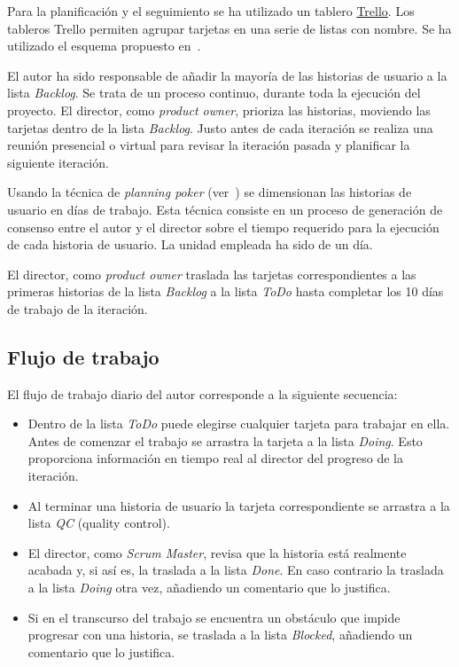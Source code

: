 Para la planificación y el seguimiento se ha utilizado un tablero \href{http://trello.com}{Trello}.  Los tableros Trello permiten agrupar tarjetas en una serie de listas con nombre.  Se ha utilizado el esquema propuesto en~\cite{andrewlittlefield2018}.

El autor ha sido responsable de añadir la mayoría de las historias de usuario a la lista \emph{Backlog}.  Se trata de un proceso continuo, durante toda la ejecución del proyecto.  El director, como \emph{product owner}, prioriza las historias, moviendo las tarjetas dentro de la lista \emph{Backlog}.  Justo antes de cada iteración se realiza una reunión presencial o virtual para revisar la iteración pasada y planificar la siguiente iteración.

Usando la técnica de \emph{planning poker} (ver~\cite{scrumguide}) se dimensionan las historias de usuario en días de trabajo.  Esta técnica consiste en un proceso de generación de consenso entre el autor y el director sobre el tiempo requerido para la ejecución de cada historia de usuario.  La unidad empleada ha sido de un día.

El director, como \emph{product owner} traslada las tarjetas correspondientes a las primeras historias de la lista \emph{Backlog} a la lista \emph{ToDo} hasta completar los 10 días de trabajo de la iteración.

\subsection{Flujo de trabajo}

El flujo de trabajo diario del autor corresponde a la siguiente secuencia:

\begin{itemize}
    \item Dentro de la lista \emph{ToDo} puede elegirse cualquier tarjeta para trabajar en ella.  Antes de comenzar el trabajo se arrastra la tarjeta a la lista \emph{Doing}.  Esto proporciona información en tiempo real al director del progreso de la iteración.
    
    \item Al terminar una historia de usuario la tarjeta correspondiente se arrastra a la lista \emph{QC} (quality control).
    
    \item El director, como \emph{Scrum Master}, revisa que la historia está realmente acabada y, si así es, la traslada a la lista \emph{Done}. En caso contrario la traslada a la lista \emph{Doing} otra vez, añadiendo un comentario que lo justifica.

    \item Si en el transcurso del trabajo se encuentra un obstáculo que impide progresar con una historia, se traslada a la lista \emph{Blocked}, añadiendo un comentario que lo justifica.
\end{itemize}

